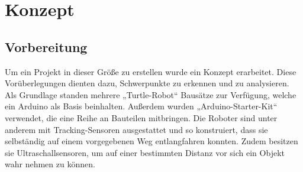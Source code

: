 \chapter{Konzept}


\section{Vorbereitung}
Um ein Projekt in dieser Größe zu erstellen wurde ein Konzept erarbeitet. Diese Vorüberlegungen dienten dazu, Schwerpunkte zu erkennen und zu analysieren. Als Grundlage standen mehrere „Turtle-Robot“ Bausätze zur Verfügung, welche ein Arduino als Basis beinhalten. Außerdem wurden „Arduino-Starter-Kit“ verwendet, die eine Reihe an Bauteilen mitbringen.
Die Roboter sind  unter anderem mit Tracking-Sensoren ausgestattet und so konstruiert, dass
sie selbständig auf einem vorgegebenen Weg entlangfahren konnten. Zudem besitzen sie Ultraschallsensoren, um auf einer bestimmten Distanz vor sich ein Objekt wahr nehmen zu können. 


